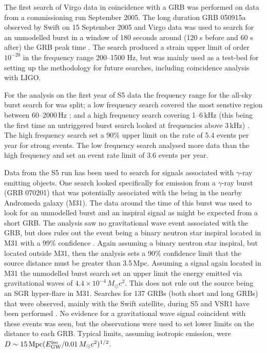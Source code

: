 \documentclass{article}
\begin{document}
The first search of Virgo data in coincidence with a GRB was performed on data
from a commissioning run September 2005. The long duration GRB 050915a observed
by Swift on 15 September 2005 and Virgo data was used to search for an 
unmodelled burst in a window of 180 seconds around (120 s before and 60 s after)
the GRB peak time \cite{Acernese:2008a}. The search produced a strain upper
limit of order $10^{-20}$ in the frequency range 200--1500 Hz, but was mainly
used as a test-bed for setting up the methodology for future searches, including
coincidence analysis with LIGO.

For the analysis on the first year of S5 data the frequency range for the
all-sky burst search for was split; a low frequency search covered the most
senstive region between 60--2000\,Hz \cite{Abbott:2009h}; and a high frequency
search covering 1--6\,kHz (this being the first time an
untriggered burst search looked at frequencies above 3\,kHz)
\cite{Abbott:2009i}. The high frequency search
set a 90\% upper limit on the rate of 5.4 events per year for strong events. The
low frequency search analysed more data than the high frequency and set an
event rate limit of 3.6 events per year. 

Data from the S5 run has been used to search for signals associated with
$\gamma$-ray emitting objects. One search looked specifically for emission from
a $\gamma$-ray burst (GRB 070201) \cite{Golenetskii:2007a, Golenetskii:2007b}
that was potentially associated with the being in the nearby Andromeda galaxy
(M31). The data around the time of this burst was used to look for an
unmodelled burst and an inspiral signal as might be expected from a short GRB.
The analysis saw no gravitational wave event associated with the GRB, but does
rules out the event being a binary neutron star inspiral located in M31 with a
99\% confidence \cite{Abbott:2008g}. Again assuming a binary neutron star
inspiral, but located outside M31, then the analysis sets a 90\% confidence
limit that the source distance must be greater than 3.5\,Mpc. Assuming a signal
again located in M31 the unmodelled burst search set an upper limit the energy
emitted via gravitational waves of $4.4\times10^{-4}\,M_{\odot}$c$^2$. This
does not rule out the source being an SGR hyper-flare in M31. Searches for 137
GRBs (both short and long GRBs) that were observed, mainly with the Swift
satellite, during S5 and VSR1 have been performed \cite{Abbott:2009d}. No
evidence for a gravitational wave signal coincident with these events was seen,
but the observations were used to set lower limits on the distance to each GRB.
Typical limits, assuming isotropic emission, were $D\sim15\,{\rm Mpc}(E^{\rm
iso}_{\rm GW}/0.01\,M_{\odot}c^2)^{1/2}$.
\end{document}
